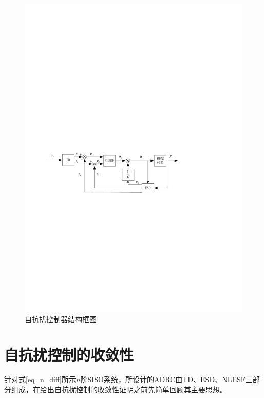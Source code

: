 \begin{figure}[htbp]
	\centering	
	\includegraphics[scale=1]{Fig/Fig_ADRC.pdf}
	\caption{\label{fig_ADRC}自抗扰控制器结构框图}
\end{figure}
\section{自抗扰控制的收敛性}
针对式\eqref{eq_n_diff}所示$ n $阶SISO系统，所设计的ADRC由TD、ESO、NLESF三部分组成，在给出自抗扰控制的收敛性证明之前先简单回顾其主要思想。


